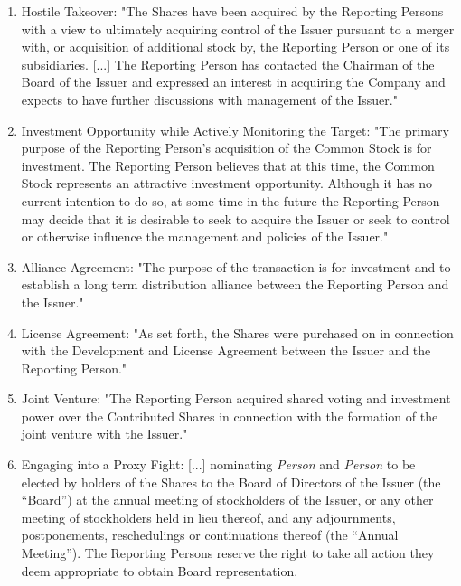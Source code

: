 \documentclass[12pt]{article}
\begin{document}
\begin{appendices}
\begin{enumerate}
\item Hostile Takeover: "The Shares have been acquired by the Reporting Persons with a view to ultimately acquiring  control of the Issuer  pursuant to a merger with, or  acquisition of additional  stock  by,  the Reporting Person  or one of its  subsidiaries. [...]
The Reporting Person has contacted the Chairman of the Board of the Issuer and expressed an interest in acquiring the Company and expects to have further discussions  with management of the Issuer."

\item Investment Opportunity while Actively Monitoring the Target: "The primary purpose of the Reporting Person's acquisition of the Common Stock is for investment. The Reporting Person believes that at this time, the Common Stock represents an attractive investment opportunity. Although it has no current intention to do so, at some time in the future the Reporting Person may decide that it is desirable to seek to acquire the Issuer or seek to control or otherwise influence the management and policies of the Issuer."

\item Alliance Agreement: "The purpose of the transaction is for investment and to establish a long term distribution alliance between the Reporting Person and the Issuer."

\item License Agreement: "As set forth, the Shares were purchased on  in connection with the Development and License Agreement between the Issuer and the Reporting Person."

\item Joint Venture: "The Reporting Person acquired shared voting and investment power over the Contributed Shares in connection with the formation of the joint venture with the Issuer."

\item Engaging into a Proxy Fight: [...] nominating \emph{Person} and \emph{Person} to be elected by holders of the Shares to the Board of Directors of the Issuer (the “Board”) at the annual meeting of stockholders of the Issuer, or any other meeting of stockholders held in lieu thereof, and any adjournments, postponements, reschedulings or continuations thereof (the “Annual Meeting”). The Reporting Persons reserve the right to take all action they deem appropriate to obtain Board representation. 


\end{enumerate}
\end{appendices}
\end{document}
